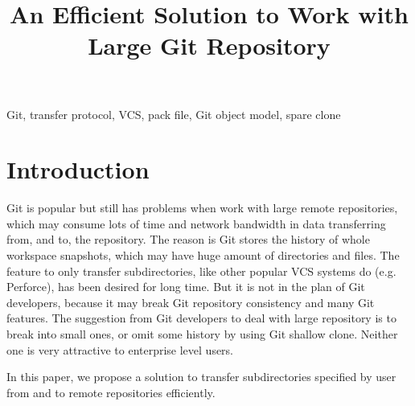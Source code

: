 \documentclass[preprint]{sigplanconf}
\begin{document}
\title{An Efficient Solution to Work with Large Git Repository}
\maketitle
{}

\keywords
Git, transfer protocol, VCS, pack file, Git object model, spare
clone

\section{Introduction}
Git is popular but still has problems when work with large remote repositories,
which may consume lots of time and network bandwidth in data transferring from,
and to, the repository.
The reason is Git stores the history of whole workspace snapshots, which may 
have huge amount of directories and files.
The feature to only transfer subdirectories, like other popular VCS systems do
(e.g. Perforce), has been desired for long time.
But it is not in the plan of Git developers, because it may break Git
repository consistency and many Git features.
The suggestion from Git developers to deal with large repository is to break
into small ones, or omit some history by using Git shallow clone.
Neither one is very attractive to enterprise level users.

In this paper, we propose a solution to transfer subdirectories specified by
user from and to remote repositories efficiently.
\end{document}
